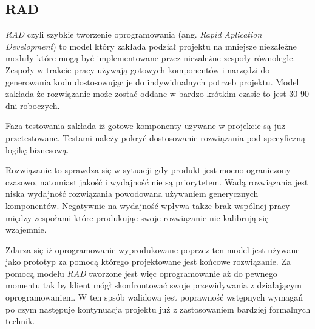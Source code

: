 \subsection{RAD}
\textit{RAD} czyli szybkie tworzenie oprogramowania (ang. \textit{Rapid Aplication Development}) to model który zakłada podział projektu na mniejsze
 niezależne moduły które mogą być implementowane przez niezależne zespoły równolegle. Zespoły w trakcie pracy używają gotowych komponentów i narzędzi do generowania kodu dostosowując je do indywidualnych potrzeb projektu. Model zakłada że rozwiązanie może zostać oddane w bardzo krótkim czasie to jest 30-90 dni roboczych.

Faza testowania zakłada iż gotowe komponenty używane w projekcie są już przetestowane. Testami należy pokryć dostosowanie rozwiązania pod specyficzną logikę biznesową. 

Rozwiązanie to sprawdza się w sytuacji gdy produkt jest mocno ograniczony czasowo, natomiast jakość i wydajność nie są priorytetem. Wadą rozwiązania jest niska wydajność rozwiązania powodowana używaniem generycznych komponentów. Negatywnie na wydajność wpływa także brak wspólnej pracy między zespołami które produkując swoje rozwiązanie nie kalibrują się wzajemnie.

Zdarza się iż oprogramowanie wyprodukowane poprzez ten model jest używane jako prototyp za pomocą którego projektowane jest końcowe rozwiązanie. Za pomocą modelu \textit{RAD} tworzone jest więc oprogramowanie aż do pewnego momentu tak by klient mógł skonfrontować swoje przewidywania z działającym oprogramowaniem. W ten spsób walidowa jest poprawność wstępnych wymagań po czym następuje kontynuacja projektu już z zastosowaniem bardziej formalnych technik.
